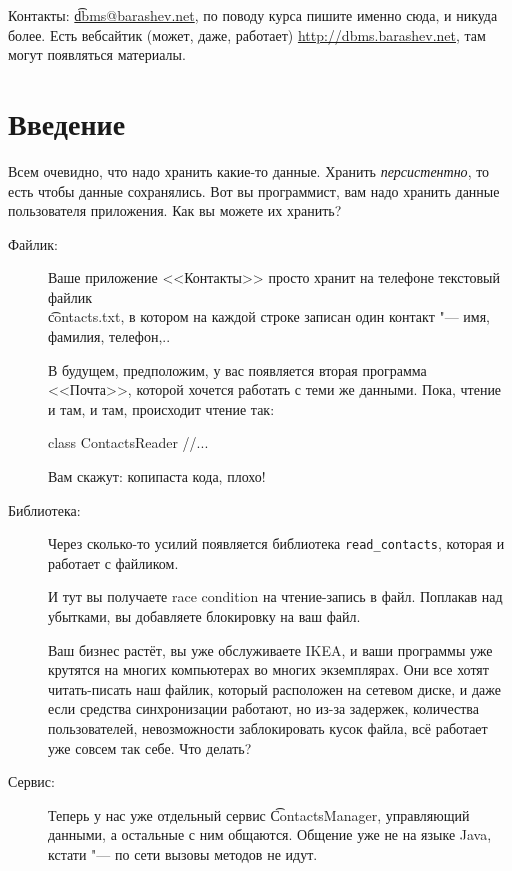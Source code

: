 Контакты: \href{mailto:dbms@barashev.net}{\t{dbms@barashev.net}}, по поводу курса пишите именно сюда, и никуда более.
Есть вебсайтик (может, даже, работает) \url{http://dbms.barashev.net}, там могут появляться материалы.

\section{Введение}

Всем очевидно, что надо хранить какие-то данные.
Хранить \textit{персистентно}, то есть чтобы данные сохранялись.
Вот вы программист, вам надо хранить данные пользователя приложения.
Как вы можете их хранить?
\begin{description}
\item[Файлик:]
	Ваше приложение <<Контакты>> просто хранит на телефоне текстовый файлик \\\t{contacts.txt},
	в котором на каждой строке записан один контакт "--- имя, фамилия, телефон,..

	В будущем, предположим, у вас появляется вторая программа <<Почта>>, которой хочется работать с теми же данными.
	Пока, чтение и там, и там, происходит чтение так:
\begin{javacode}
class ContactsReader {
	//...
}
\end{javacode}
	Вам скажут: копипаста кода, плохо!

\item[Библиотека:]
	Через сколько-то усилий появляется библиотека \verb'read_contacts', которая и работает с файликом.

	И тут вы получаете race condition на чтение-запись в файл.
	Поплакав над убытками, вы добавляете блокировку на ваш файл.

	Ваш бизнес растёт, вы уже обслуживаете IKEA, и ваши программы уже крутятся на многих компьютерах во многих экземплярах.
	Они все хотят читать-писать наш файлик, который расположен на сетевом диске, и даже если средства синхронизации работают,
	но из-за задержек, количества пользователей, невозможности заблокировать кусок файла, всё работает уже совсем так себе.
	Что делать?

\item[Сервис:]
	Теперь у нас уже отдельный сервис \t{ContactsManager}, управляющий данными, а остальные с ним общаются.
	Общение уже не на языке Java, кстати "--- по сети вызовы методов не идут.


\end{description}
